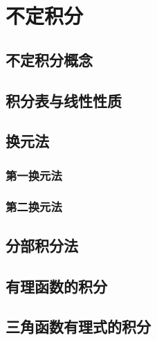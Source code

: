

\chapter{不定积分}\label{ch:6}
\section{不定积分概念}
\begin{exercise}
\item
\end{exercise}
\section{积分表与线性性质}
\begin{exercise}
\item
\end{exercise}
\section{换元法}
\subsection{第一换元法}
\subsection{第二换元法}
\begin{exercise}
\item
\end{exercise}
\section{分部积分法}
\begin{exercise}
\item
\end{exercise}
\section{有理函数的积分}
\begin{exercise}
\item
\end{exercise}
\section{三角函数有理式的积分}
\begin{exercise}
\item
\end{exercise}
